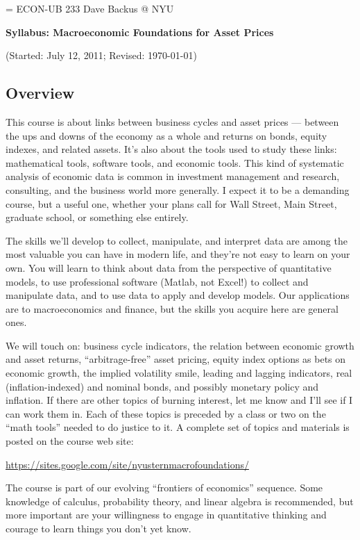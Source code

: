 \documentclass[11pt]{article}
\begin{document}
\parskip=\bigskipamount
\parindent=0.0in
\thispagestyle{empty}
{\large ECON-UB 233 \hfill Dave Backus @ NYU}

\bigskip\bigskip
\centerline{\Large \bf Syllabus:  Macroeconomic Foundations for Asset Prices}
\centerline{(Started: July 12, 2011; Revised: \today)}

\subsection*{Overview}

This course is about links between business cycles
and asset prices ---
between the ups and downs of the economy as a whole
and returns on bonds, equity indexes, and related assets.
It's also about the tools used to study these links:
mathematical tools, software tools, and economic tools.
This kind of systematic analysis of economic data is common in
investment management and research, consulting,
and the business world more generally.
I expect it to be a demanding course, but a useful one,
whether your plans call for Wall Street, Main Street,
graduate school, or something else entirely.


The skills we'll develop to collect, manipulate,
and interpret data
are among the most valuable you can have in modern life,
and they're not easy to learn on your own.
You will learn to think about data from the
perspective of quantitative models,
to use professional software
(Matlab, not Excel!) to collect and manipulate data,
and to use data to apply and develop models.
Our applications are to macroeconomics and finance,
but the skills you acquire here are general ones.


We will touch on:
business cycle indicators,
the relation between economic growth and asset returns,
``arbitrage-free'' asset pricing,
equity index options as bets on economic growth,
the implied volatility smile,
leading and lagging indicators,
real (inflation-indexed) and nominal bonds,
and possibly monetary policy and inflation.
If there are other topics of burning interest, let me know
and I'll see if I can work them in.
Each of these topics is preceded by a class or two on
the ``math tools'' needed to do justice to it.
A complete set of topics and materials is posted on
the course web site:

\medskip
\centerline{\url{https://sites.google.com/site/nyusternmacrofoundations/}}

The course is part of our evolving ``frontiers of economics''
sequence.
Some knowledge of calculus, probability theory,
and linear algebra is recommended,
but more important are your willingness to engage in quantitative thinking
and courage to learn things you don't yet know.
\end{document}
